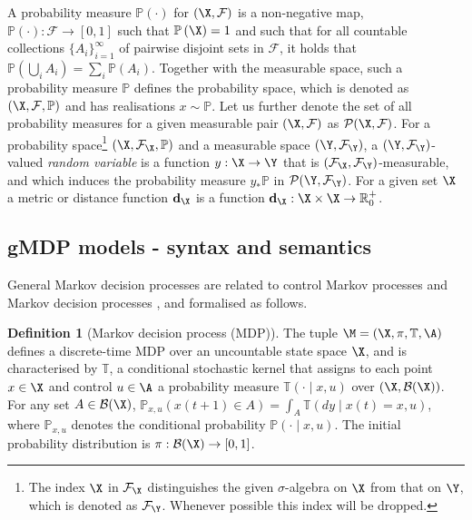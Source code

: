 \documentclass[letterpaper, 10 pt, conference]{amsart}
\theoremstyle{definition}
\newtheorem{defn}[definition]{Definition}
\theoremstyle{example}
\theoremstyle{remark}
\newcommand{\po}{\mathbb{P}}     \newcommand{\p}[1]{\po\left(#1\right)}     \newcommand{\pd}[1]{p\left(#1\right)}     \newcommand{\borel}[1]{\mathcal{B}\left(#1\right)}
\begin{document}
A probability measure $\p{\cdot}$ for $(\X,\mathcal{ F})$ is a non-negative map, 
$\p{\cdot}:\mathcal{ F}\rightarrow [0,1]$ such that $\p{\X}=1$ and such that for all countable collections $\{A_i\}_{i=1}^\infty$ of pairwise disjoint sets in $\mathcal{F}$, 
it holds that  
$\p{\bigcup_i A_i }=\sum _i \p{A_i}$.   
Together with the measurable space, such a probability measure $\po$ defines the probability space, which is denoted as $(\X,\mathcal F,\po)$ and has realisations  $x\sim \po$.   
Let us further denote the set of all probability measures for a given measurable pair $(\X,\mathcal{ F})$ as $\mathcal P (\X,\mathcal{ F})$.  
\setcounter{footnote}{0} 
For a probability space\footnote{The index $\X$ in $\mathcal F_\X$ distinguishes the given $\sigma$-algebra on $\X$ from that on $\Y$, which is denoted as $\mathcal F_\Y$. 
Whenever possible this index will be dropped.}  $(\X,\mathcal F_\X,\po)$ and a measurable space $(\Y,\mathcal F_\Y)$, a $(\Y,\mathcal F_\Y)$- valued \emph{random variable}  is a function $y:\X\rightarrow \Y$ that is $(\mathcal F_\X,\mathcal F_\Y)$-measurable, 
 and which induces the probability measure $y_\ast \po$ in $\mathcal P(\Y,\mathcal F_\Y)$.  
For a given set $\X$ a metric or distance function $\mathbf d_\X$ is a function $\mathbf{d}_\X: \X\times \X\rightarrow \mathbb R_0^+$. 

\subsection{gMDP models - syntax and semantics}
General Markov decision processes are related to control Markov processes \cite{Abate2011} and Markov decision processes \cite{bible,mt1993,hll1996}, 
and formalised as follows.  
\begin{defn}[Markov decision process (MDP)] \label{def:MDP}
The tuple $\M=(\X,\pi,\mathbb T,\A)$ defines a discrete-time MDP over an uncountable state space $\X$, and is characterised by $\mathbb T$, a conditional stochastic kernel that assigns to each point $x\in \X$ and control $u\in \A$ a probability measure $\mathbb T(\cdot\mid x,u)$ over $(\X,\mathcal B(\X))$. For any set $A\in \mathcal{B}(\X)$, $\po_{x,u}(x(t+1)\in A)=\int_A \mathbb T(dy\mid x(t)=x,u)$, where $\po_{x,u}$ denotes the conditional probability $\po(\cdot\mid x,u)$. The initial probability distribution is $\pi:\mathcal{B}(\X)\rightarrow [0,1]$. 
\end{defn}
\end{document}
